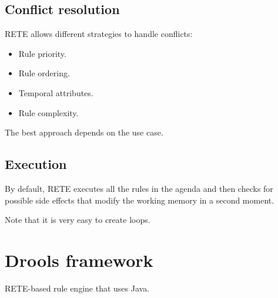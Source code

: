 \subsection{Conflict resolution}
RETE allows different strategies to handle conflicts:
\begin{itemize}
    \item Rule priority.
    \item Rule ordering.
    \item Temporal attributes.
    \item Rule complexity.
\end{itemize}
The best approach depends on the use case.


\subsection{Execution}
By default, RETE executes all the rules in the agenda and 
then checks for possible side effects that modify the working memory in a second moment.

Note that it is very easy to create loops.



\section{Drools framework}

RETE-based rule engine that uses Java.

